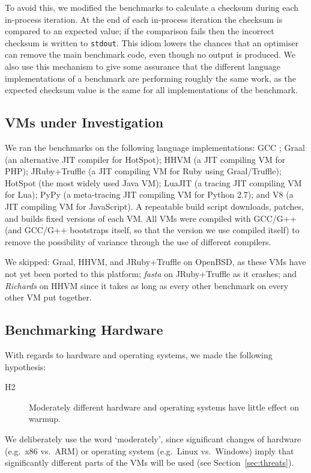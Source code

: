 \documentclass[acmsmall,screen]{acmart}
\newcommand{\hyptwo}{H2\xspace}
\newcommand{\richards}{\emph{Richards}\xspace}
\newcommand{\fasta}{\emph{fasta}\xspace}
\begin{document}
To avoid this, we modified the benchmarks to calculate a checksum
during each in-process iteration. At the end of each in-process iteration
the checksum is compared to an expected value; if the comparison fails then
the incorrect checksum is written to \texttt{stdout}. This idiom
lowers the chances that an optimiser can remove the main benchmark
code, even though no output is produced. We also use this mechanism to give some assurance
that the different language implementations of a benchmark are performing
roughly the same work, as the expected checksum value is the same for all
implementations of the benchmark.


\subsection{VMs under Investigation}
\label{sec:vms}

We ran the benchmarks on the following language implementations: GCC \gccversion;
Graal \graalversion (an alternative JIT compiler for HotSpot); HHVM \hhvmversion (a JIT
compiling VM for PHP); JRuby+Truffle \trufflerubyversion{} (a JIT compiling VM
for Ruby using Graal/Truffle);
HotSpot \hotspotversion (the most widely used Java
VM); LuaJIT \luajitversion (a tracing JIT compiling VM for Lua); PyPy \pypyversion (a
meta-tracing JIT compiling VM for Python 2.7); and V8 \veightversion (a JIT
compiling VM for JavaScript). A repeatable build script downloads, patches,
and builds fixed versions of each VM. All VMs were compiled with GCC/G++ \gccversion
(and GCC/G++ bootstraps itself, so that the version we use compiled itself)
to remove the possibility of variance through the use of different compilers.

\label{openbsd porting} We skipped: Graal, HHVM, and JRuby+Truffle on OpenBSD, as
these VMs have not yet been ported to this platform; \fasta on JRuby+Truffle as
it crashes; and \richards on HHVM since it takes as long as every other benchmark
on every other VM put together.


\subsection{Benchmarking Hardware}

With regards to hardware and operating systems, we made the
following hypothesis:
\begin{description}
  \item[\hyptwo] Moderately different hardware and operating systems have little effect on warmup.
\end{description}
We deliberately use the word `moderately', since significant changes of hardware
(e.g.~x86 vs.~ARM) or operating system (e.g.~Linux vs.~Windows) imply that
significantly different parts of the VMs will be used (see Section~\ref{sec:threats}).
\end{document}
